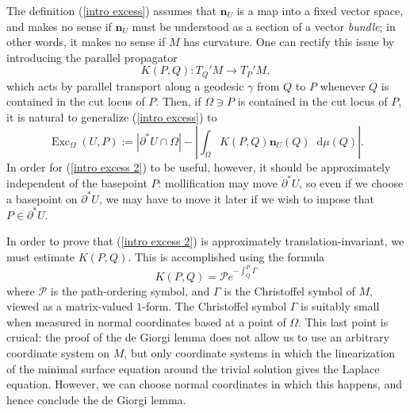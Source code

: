 \documentclass[reqno,11pt]{amsart}
\newcommand{\RR}{\mathbf{R}}
\newcommand{\Hyp}{\mathbf H}
\DeclareMathOperator{\Exc}{Exc}
\newcommand*\dif{\mathop{}\!\mathrm{d}}
\newcommand{\normal}{\mathbf n}
\theoremstyle{definition}
\numberwithin{equation}{section}
\begin{document}
The definition (\ref{intro excess}) assumes that $\normal_U$ is a map into a fixed vector space, and makes no sense if $\normal_U$ must be understood as a section of a vector \emph{bundle}; in other words, it makes no sense if $M$ has curvature.
One can rectify this issue by introducing the parallel propagator
$$K(P, Q): T_Q'M \to T_P'M,$$
which acts by parallel transport along a geodesic $\gamma$ from $Q$ to $P$ whenever $Q$ is contained in the cut locus of $P$.
Then, if $\Omega \ni P$ is contained in the cut locus of $P$, it is natural to generalize (\ref{intro excess}) to
\begin{equation}\label{intro excess 2}
\Exc_\Omega(U, P) := |\partial^* U \cap \Omega| - \left|\int_\Omega K(P, Q) \normal_U(Q) \dif \mu(Q)\right|.
\end{equation}
In order for (\ref{intro excess 2}) to be useful, however, it should be approximately independent of the basepoint $P$: mollification may move $\partial^* U$, so even if we choose a basepoint on $\partial^* U$, we may have to move it later if we wish to impose that $P \in \partial^* U$.

In order to prove that (\ref{intro excess 2}) is approximately translation-invariant, we must estimate $K(P, Q)$.
This is accomplished using the formula \cite[Chapter II, \S2]{baez1994gauge}
$$K(P, Q) = \mathcal Pe^{-\int_Q^P \Gamma}$$
where $\mathcal P$ is the path-ordering symbol, and $\Gamma$ is the Christoffel symbol of $M$, viewed as a matrix-valued $1$-form.
The Christoffel symbol $\Gamma$ is suitably small when measured in normal coordinates based at a point of $\Omega$.
This last point is cruical: the proof of the de Giorgi lemma does not allow us to use an arbitrary coordinate system on $M$, but only coordinate systems in which the linearization of the minimal surface equation around the trivial solution gives the Laplace equation.
However, we can choose normal coordinates in which this happens, and hence conclude the de Giorgi lemma.

\end{document}
